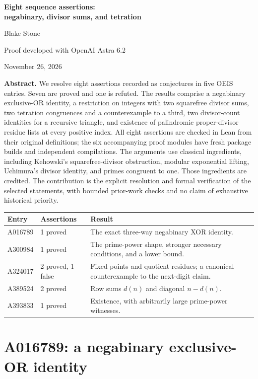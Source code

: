 \documentclass[11pt]{article}
\begin{document}
\begin{center}
{\LARGE\bfseries Eight sequence assertions:\\[3pt]
negabinary, divisor sums, and tetration}\par
\vspace{0.5em}
{\large Blake Stone}\par
Proof developed with OpenAI Astra 6.2\par
November 26, 2026
\end{center}

\textbf{Abstract.}
We resolve eight assertions recorded as conjectures in five OEIS entries.
Seven are proved and one is refuted. The results comprise a negabinary
exclusive-OR identity, a restriction on integers with two squarefree
divisor sums, two tetration congruences and a counterexample to a third,
two divisor-count identities for a recursive triangle, and existence of
palindromic proper-divisor residue lists at every positive index.
All eight assertions are checked in Lean from their original definitions;
the six accompanying proof modules have fresh package builds and
independent compilations. The arguments use classical ingredients,
including Kehowski's squarefree-divisor obstruction, modular exponential
lifting, Uchimura's divisor identity, and primes congruent to one.
Those ingredients are credited. The contribution is the explicit
resolution and formal verification of the selected statements, with
bounded prior-work checks and no claim of exhaustive historical priority.

\begin{center}
\begin{tabular}{@{}llp{3.7in}@{}}
\toprule
Entry & Assertions & Result\\
\midrule
A016789 & 1 proved & The exact three-way negabinary XOR identity.\\
A300984 & 1 proved & The prime-power shape, stronger necessary conditions, and a lower bound.\\
A324017 & 2 proved, 1 false & Fixed points and quotient residues; a canonical counterexample to the next-digit claim.\\
A389524 & 2 proved & Row sums $d(n)$ and diagonal $n-d(n)$.\\
A393833 & 1 proved & Existence, with arbitrarily large prime-power witnesses.\\
\bottomrule
\end{tabular}
\end{center}

\section{A016789: a negabinary exclusive-OR identity}
\end{document}
